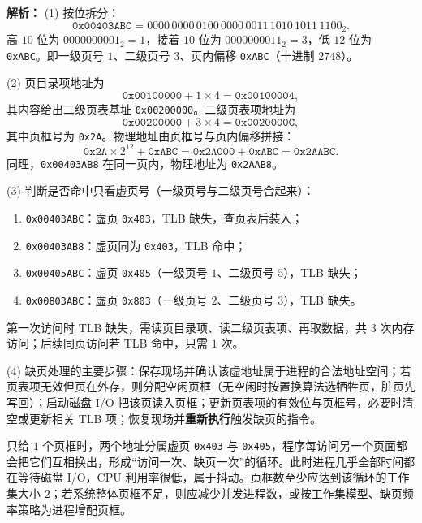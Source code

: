 \begin{enumerate}[start=7]
\ifshowsolutions\par\noindent\textbf{解析：}
(1) 按位拆分：
\[
\texttt{0x00403ABC}=0000\,0000\,0100\,0000\,0011\,1010\,1011\,1100_2 .
\]
高 $10$ 位为 $0000000001_2=1$，接着 $10$ 位为 $0000000011_2=3$，低 $12$ 位为 \texttt{0xABC}。即一级页号 $1$、二级页号 $3$、页内偏移 \texttt{0xABC}（十进制 $2748$）。

(2) 页目录项地址为
\[
\texttt{0x00100000}+1\times4=\texttt{0x00100004},
\]
其内容给出二级页表基址 \texttt{0x00200000}。二级页表项地址为
\[
\texttt{0x00200000}+3\times4=\texttt{0x0020000C},
\]
其中页框号为 \texttt{0x2A}。物理地址由页框号与页内偏移拼接：
\[
\texttt{0x2A}\times2^{12}+\texttt{0xABC}
=\texttt{0x2A000}+\texttt{0xABC}=\texttt{0x2AABC}.
\]
同理，\texttt{0x00403AB8} 在同一页内，物理地址为 \texttt{0x2AAB8}。

(3) 判断是否命中只看虚页号（一级页号与二级页号合起来）：
\begin{enumerate}[label=(\arabic*)]
\item \texttt{0x00403ABC}：虚页 \texttt{0x403}，TLB 缺失，查页表后装入；
\item \texttt{0x00403AB8}：虚页同为 \texttt{0x403}，TLB 命中；
\item \texttt{0x00405ABC}：虚页 \texttt{0x405}（一级页号 $1$、二级页号 $5$），TLB 缺失；
\item \texttt{0x00803ABC}：虚页 \texttt{0x803}（一级页号 $2$、二级页号 $3$），TLB 缺失。
\end{enumerate}
第一次访问时 TLB 缺失，需读页目录项、读二级页表项、再取数据，共 $3$ 次内存访问；后续同页访问若 TLB 命中，只需 $1$ 次。

(4) 缺页处理的主要步骤：保存现场并确认该虚地址属于进程的合法地址空间；若页表项无效但页在外存，则分配空闲页框（无空闲时按置换算法选牺牲页，脏页先写回）；启动磁盘 I/O 把该页读入页框；更新页表项的有效位与页框号，必要时清空或更新相关 TLB 项；恢复现场并\textbf{重新执行}触发缺页的指令。

只给 $1$ 个页框时，两个地址分属虚页 \texttt{0x403} 与 \texttt{0x405}，程序每访问另一个页面都会把它们互相换出，形成“访问一次、缺页一次”的循环。此时进程几乎全部时间都在等待磁盘 I/O，CPU 利用率很低，属于抖动。页框数至少应达到该循环的工作集大小 $2$；若系统整体页框不足，则应减少并发进程数，或按工作集模型、缺页频率策略为进程增配页框。

\par\noindent{}\else \answerarea[14] \fi

\end{enumerate}
